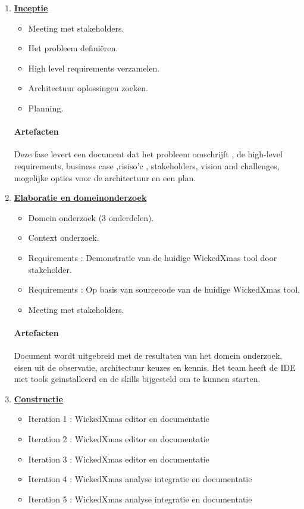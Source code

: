 \begin{enumerate}
\item \underline{\textbf{Inceptie}}
		\begin{itemize}
			\item Meeting met stakeholders.
			\item Het probleem definiëren.
			\item High level requirements verzamelen.
			\item Architectuur oplossingen zoeken.
			\item Planning. 
		\end{itemize}
		\paragraph{Artefacten}
		Deze fase levert een document dat het probleem omschrijft , de high-level requirements, business case ,risiso'c , stakeholders, vision and challenges, mogelijke opties voor de architectuur en een plan.
	
\item \underline{\textbf{Elaboratie en domeinonderzoek}}
	\begin{itemize}
		\item Domein onderzoek (3 onderdelen).
		\item Context onderzoek.
		\item Requirements : Demonstratie van de huidige WickedXmas tool door stakeholder.
		\item Requirements : Op basis van sourcecode van de huidige WickedXmas tool.
		\item Meeting met stakeholders.
	\end{itemize}
	\paragraph{Artefacten}
	Document wordt uitgebreid met de resultaten van het domein onderzoek, eisen uit de observatie, architectuur keuzes en kennis.
	Het team heeft de IDE met tools geïnstalleerd en de skills bijgesteld om  te kunnen starten.   
	
\item \underline{\textbf{Constructie}}

		\begin{itemize}
			\item Iteration 1 : WickedXmas editor en documentatie
			\item Iteration 2 : WickedXmas editor en documentatie
			\item Iteration 3 : WickedXmas editor en documentatie
			\item Iteration 4 : WickedXmas analyse integratie en documentatie
			\item Iteration 5 : WickedXmas analyse integratie en documentatie
		\end{itemize}
		

\end{enumerate}
